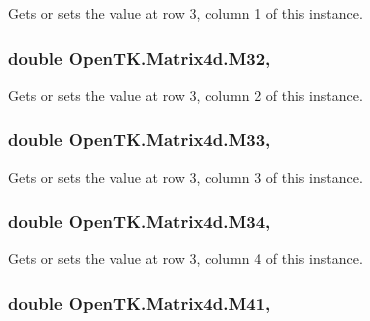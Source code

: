 Gets or sets the value at row 3, column 1 of this instance. 

\hypertarget{struct_open_t_k_1_1_matrix4d_a98f2e04b921569d28fb548e283a6f640}{
\subsubsection[{M32}]{\setlength{\rightskip}{0pt plus 5cm}double Open\-T\-K.\-Matrix4d.\-M32\hspace{0.3cm}{\ttfamily [get]}, {\ttfamily [set]}}}\label{struct_open_t_k_1_1_matrix4d_a98f2e04b921569d28fb548e283a6f640}


Gets or sets the value at row 3, column 2 of this instance. 

\hypertarget{struct_open_t_k_1_1_matrix4d_a1f6a33102447d3e336d765015233cb6a}{
\subsubsection[{M33}]{\setlength{\rightskip}{0pt plus 5cm}double Open\-T\-K.\-Matrix4d.\-M33\hspace{0.3cm}{\ttfamily [get]}, {\ttfamily [set]}}}\label{struct_open_t_k_1_1_matrix4d_a1f6a33102447d3e336d765015233cb6a}


Gets or sets the value at row 3, column 3 of this instance. 

\hypertarget{struct_open_t_k_1_1_matrix4d_a744e9492a99b731d3d8065f1f0049059}{
\subsubsection[{M34}]{\setlength{\rightskip}{0pt plus 5cm}double Open\-T\-K.\-Matrix4d.\-M34\hspace{0.3cm}{\ttfamily [get]}, {\ttfamily [set]}}}\label{struct_open_t_k_1_1_matrix4d_a744e9492a99b731d3d8065f1f0049059}


Gets or sets the value at row 3, column 4 of this instance. 

\hypertarget{struct_open_t_k_1_1_matrix4d_a076f90400e36e9744303b0517bf06f0e}{
\subsubsection[{M41}]{\setlength{\rightskip}{0pt plus 5cm}double Open\-T\-K.\-Matrix4d.\-M41\hspace{0.3cm}{\ttfamily [get]}, {\ttfamily [set]}}}\label{struct_open_t_k_1_1_matrix4d_a076f90400e36e9744303b0517bf06f0e}



